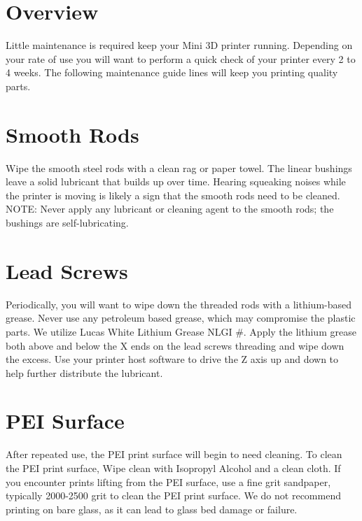 %
%
%
%
%

\section{Overview}
Little maintenance is required keep your Mini 3D printer running. Depending on your rate of use you will want to perform a quick check of your printer every 2 to 4 weeks. The following maintenance guide lines will keep you printing quality parts.

\section{Smooth Rods}
Wipe the smooth steel rods with a clean rag or paper towel. The linear bushings leave a solid lubricant that builds up over time. Hearing squeaking noises while the printer is moving is likely a sign that the smooth rods need to be cleaned. NOTE: Never apply any lubricant or cleaning agent to the smooth rods; the bushings are self-lubricating.

\section{Lead Screws}
Periodically, you will want to wipe down the threaded rods with a lithium-based grease. Never use any petroleum based grease, which may compromise the plastic parts. We utilize Lucas White Lithium Grease NLGI #\2. Apply the lithium grease both above and below the X ends on the lead screws threading and wipe down the excess. Use your printer host software to drive the Z axis up and down to help further distribute the lubricant.

\section{PEI Surface}
After repeated use, the PEI print surface will begin to need cleaning. To clean the PEI print surface, Wipe clean with Isopropyl Alcohol and a clean cloth. If you encounter prints lifting from the PEI surface, use a fine grit sandpaper, typically 2000-2500 grit to clean the PEI print surface. We do not recommend printing on bare glass, as it can lead to glass bed damage or failure.

